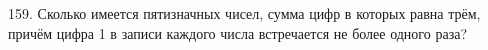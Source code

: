 159. Сколько имеется пятизначных чисел, сумма цифр в которых равна трём, причём цифра 1 в записи каждого числа встречается не более одного раза?\\

